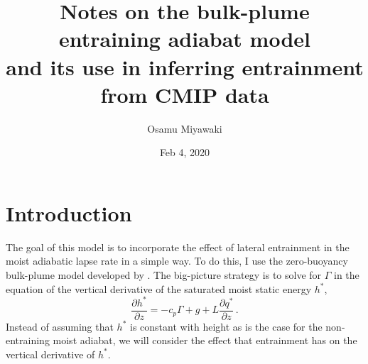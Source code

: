 \documentclass{article}
\title{Notes on the bulk-plume entraining adiabat model\\ and its use in inferring entrainment from CMIP data}
\author{Osamu Miyawaki}
\date{Feb 4, 2020}
\begin{document}
\maketitle
\section{Introduction}
The goal of this model is to incorporate the effect of lateral entrainment in the moist adiabatic lapse rate in a simple way. To do this, I use the zero-buoyancy bulk-plume model developed by \citet{singh-ogorman-2013}. The big-picture strategy is to solve for $\Gamma$ in the equation of the vertical derivative of the saturated moist static energy $h^*$,
\begin{equation}
\frac{\partial h^*}{\partial z} = - c_p \Gamma + g + L \frac{\partial q^*}{\partial z} \, .
\end{equation}
Instead of assuming that $h^*$ is constant with height as is the case for the non-entraining moist adiabat, we will consider the effect that entrainment has on the vertical derivative of $h^*$.
\end{document}
